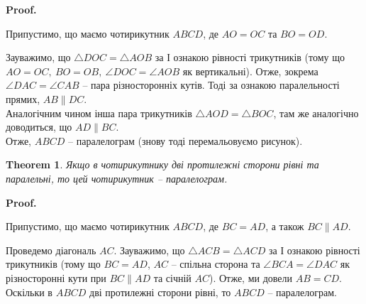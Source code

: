 \documentclass[a4paper, 10pt]{article}
\makeatletter
\theoremstyle{theoremdd}
\newtheorem{theorem}{Theorem}[subsection]
\theoremstyle{theoremdd}
\theoremstyle{theoremdd}
\theoremstyle{theoremdd}
\theoremstyle{theoremdd}
\theoremstyle{theoremdd}
\theoremstyle{theoremdd}
\theoremstyle{theoremdd}
\theoremstyle{theoremdd}
\renewenvironment{proof}[1][Proof.\\]{\par
\pushQED{\hfill \qed}%
\normalfont \topsep6\p@\@plus6\p@\relax
\trivlist
\item\relax
{\bfseries
#1\@addpunct{.}}\hspace\labelsep\ignorespaces
}{%
\popQED\endtrivlist\@endpefalse
}
\makeatother
\begin{document}
\begin{proof}
Припустимо, що маємо чотирикутник $ABCD$, де $AO = OC$ та $BO = OD$.
\begin{figure}[H]
\centering
{}
\end{figure}
Зауважимо, що $\triangle DOC = \triangle AOB$ за І ознакою рівності трикутників (тому що $AO = OC,\ BO = OB,\ \angle DOC = \angle AOB$ як вертикальні). Отже, зокрема $\angle DAC = \angle CAB$ -- пара різносторонніх кутів. Тоді за ознакою паралельності прямих, $AB \parallel DC$.\\
Аналогічним чином інша пара трикутників $\triangle AOD = \triangle BOC$, там же аналогічно доводиться, що $AD \parallel BC$.\\
Отже, $ABCD$ -- паралелограм (знову тоді перемальовуємо рисунок).
\end{proof}

\begin{theorem}
Якщо в чотирикутнику дві протилежні сторони рівні та паралельні, то цей чотирикутник -- паралелограм.
\end{theorem}

\begin{proof}
Припустимо, що маємо чотирикутник $ABCD$, де $BC = AD$, а також $BC \parallel AD$.
\begin{figure}[H]
\centering
{}
\end{figure}
Проведемо діагональ $AC$. Зауважимо, що $\triangle ACB = \triangle ACD$ за І ознакою рівності трикутників (тому що $BC = AD$, $AC$ -- спільна сторона та $\angle BCA = \angle DAC$ як різносторонні кути при $BC \parallel AD$ та січній $AC$). Отже, ми довели $AB = CD$.\\
Оскільки в $ABCD$ дві протилежні сторони рівні, то $ABCD$ -- паралелограм.
\end{proof}
\end{document}
